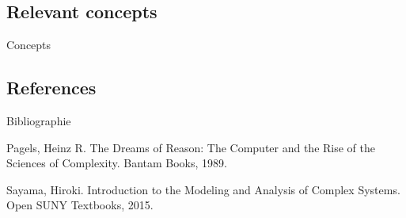 \documentclass[12pt]{article}
\begin{document}
\subsection*{Relevant concepts}{Concepts}



\subsection{References}{Bibliographie}

Pagels, Heinz R. The Dreams of Reason: The Computer and the Rise of the Sciences of Complexity. Bantam Books, 1989.

Sayama, Hiroki. Introduction to the Modeling and Analysis of Complex Systems. Open SUNY Textbooks, 2015.




\bigskip



















	
	
	
	
	
	
	
	
	
	
	
	
	
	
\end{document}
